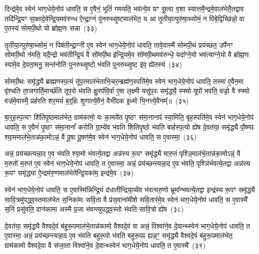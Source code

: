 दिन्द्र॑मे॒व स्वेन॑ भाग॒धेये॒नोप॑ धावति॒ स ए॒वैनं॒ भूतिं॑ गमयति॒ भव॑त्ये॒व यꣳ सू॒त्वा व॒शा स्यात्तमै॒न्द्रमे॒वाल॑भेतै॒तद्वाव तदि॑न्द्रि॒यꣳ सा॒क्षादे॒वेन्द्रि॒यमव॑रुन्ध ऐन्द्रा॒ग्नं पु॑नरुथ्सृ॒ष्टमा\-ल॑भेत॒ य आ तृ॒तीया॒त्पुरु॑षा॒थ्सोमं॒ न पिबे॒द्विच्छि॑न्नो॒ वा ए॒तस्य॑ सोमपी॒थो यो ब्रा᳚ह्म॒णः सन्ना~(३३)

तृ॒तीया॒त्पुरु॑षा॒थ्सोमं॒ न पिब॑तीन्द्रा॒ग्नी ए॒व स्वेन॑ भाग॒धेये॒नोप॑ धावति॒ तावे॒वास्मै॑ सोमपी॒थं प्रय॑च्छत॒ उपै॑नꣳ सोमपी॒थो न॑मति॒ यदै॒न्द्रो भव॑तीन्द्रि॒यं वै सो॑मपी॒थ इ॑न्द्रि॒यमे॒व सो॑मपी॒थमव॑\-रुन्धे॒ यदा᳚ग्ने॒यो भव॑त्याग्ने॒यो वै ब्रा᳚ह्म॒णः स्वामे॒व दे॒वता॒मनु॒ सन्त॑नोति पुनरुथ्सृ॒ष्टो भ॑वति पुनरुथ्सृ॒ष्ट इ॑व॒ ह्ये॑तस्य॑~(३४)

सोमपी॒थः समृ॑द्ध्यै ब्राह्मणस्प॒त्यं तू॑प॒रमाल॑भेताभि॒\-चर॒न्ब्रह्म॑ण॒स्पति॑मे॒व स्वेन॑ भाग॒धेये॒नोप॑ धावति॒ तस्मा॑ ए॒वैन॒मा वृ॑श्चति ता॒जगार्ति॒मार्च्छ॑ति तूप॒रो भ॑वति क्षु॒रप॑वि॒र्वा ए॒षा ल॒क्ष्मी यत्तू॑प॒रः समृ॑द्ध्यै॒ स्फ्यो यूपो॑ भवति॒ वज्रो॒ वै स्फ्यो वज्र॑मे॒वास्मै॒ प्रह॑रति शर॒मयं॑ ब॒र्॒\mbox{}हिः शृ॒णात्ये॒वैनं॒ वैभी॑दक इ॒ध्मो भि॒नत्त्ये॒वैनम्᳚॥~(३५)

{}%

बा॒र्॒\mbox{}ह॒स्प॒त्यꣳ शि॑तिपृ॒ष्ठमा\-ल॑भेत॒ ग्राम॑कामो॒ यः का॒मये॑त पृ॒ष्ठꣳ स॑मा॒नानाꣴ॑ स्या॒मिति॒ बृह॒स्पति॑मे॒व स्वेन॑ भाग॒धेये॒नोप॑ धावति॒ स ए॒वैनं॑ पृ॒ष्ठꣳ स॑मा॒नानां᳚ करोति ग्रा॒म्ये॑व भ॑वति शितिपृ॒ष्ठो भ॑वति बार्\mbox{}हस्प॒त्यो ह्ये॑ष दे॒वत॑या॒ समृ॑द्ध्यै पौ॒ष्णꣴ श्या॒ममाल॑भे॒तान्न॑का॒मो\-ऽन्नं॒ वै पू॒षा पू॒षण॑मे॒व स्वेन॑ भाग॒धेये॒नोप॑ धावति॒ स ए॒वास्मा॒~(३६)

अन्नं॒ प्रय॑च्छत्यन्ना॒द ए॒व भ॑वति श्या॒मो भ॑वत्ये॒तद्वा अन्न॑स्य रू॒पꣳ समृ॑द्ध्यै मारु॒तं पृश्ञि॒माल॑भे॒तान्न॑का॒मो\-ऽन्नं॒ वै म॒रुतो॑ म॒रुत॑ ए॒व स्वेन॑ भाग॒धेये॒नोप॑ धावति॒ त ए॒वास्मा॒ अन्नं॒ प्रय॑च्छन्त्यन्ना॒द ए॒व भ॑वति॒ पृश्ञि॑र्भवत्ये॒तद्वा अन्न॑स्य रू॒पꣳ समृ॑द्ध्या ऐ॒न्द्रम॑रु॒णमाल॑भेतेन्द्रि॒यका॑म॒ इन्द्र॑मे॒व~(३७)

स्वेन॑ भाग॒धेये॒नोप॑ धावति॒ स ए॒वास्मि॑न्निन्द्रि॒यं द॑धातीन्द्रिया॒\-व्ये॑व भ॑वत्यरु॒णो भ्रूमा᳚न्भवत्ये॒तद्वा इन्द्र॑स्य रू॒पꣳ समृ॑द्ध्यै सावि॒त्र\-मु॑प\-द्ध्व॒स्तमाल॑भेत स॒निका॑मः सवि॒ता वै प्र॑स॒वाना॑मीशे सवि॒तार॑मे॒व स्वेन॑ भाग॒धेये॒नोप॑ धावति॒ स ए॒वास्मै॑ स॒निं प्रसु॑वति॒ दान॑कामा अस्मै प्र॒जा भ॑वन्त्युपद्ध्व॒स्तो भ॑वति सावि॒त्रो ह्ये॑ष~(३८)

दे॒वत॑या॒ समृ॑द्ध्यै वैश्वदे॒वं ब॑हुरू॒पमाल॑भे॒तान्न॑कामो वैश्वदे॒वं वा अन्नं॒ विश्वा॑ने॒व दे॒वान्थ्स्वेन॑ भाग॒धेये॒नोप॑ धावति॒ त ए॒वास्मा॒ अन्नं॒ प्रय॑च्छन्त्यन्ना॒द ए॒व भ॑वति बहुरू॒पो भ॑वति बहुरू॒पꣴ ह्यन्न॒ꣳ॒ समृ॑द्ध्यै वैश्वदे॒वं ब॑हुरू॒पमा\-ल॑भेत॒ ग्राम॑कामो वैश्वदे॒वा वै स॑जा॒ता विश्वा॑ने॒व दे॒वान्थ्स्वेन॑ भाग॒धेये॒नोप॑ धावति॒ त ए॒वास्मै॑~(३९)

